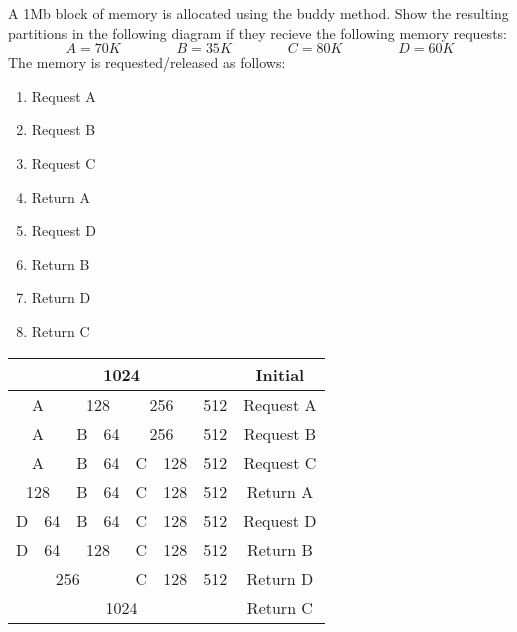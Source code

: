 \documentclass{article}
\begin{document}
\indent A 1Mb block of memory is allocated using the buddy method.
Show the resulting partitions in the following diagram if they recieve the
following memory requests:
\[
A = 70K\qquad\qquad B=35K\qquad\qquad C=80K\qquad\qquad D=60K
\]
The memory is requested/released as follows:
\begin{multicols}{2}
\begin{enumerate}
\item Request A
\item Request B
\item Request C
\item Return A
\item Request D
\item Return B
\item Return D
\item Return C
\end{enumerate}
\end{multicols}

\vspace{0.5cm}
\begin{center}
\begin{tabular}{|c c c c c c c c c c c c c c c c|c|}
\hline
\multicolumn{16}{|c|}{1024} & Initial\\
\hline
\multicolumn{2}{|c|}{A} & \multicolumn{2}{|c|}{128} & \multicolumn{4}{|c|}{256} & \multicolumn{8}{|c|}{512} & Request A\\
\hline
\multicolumn{2}{|c|}{A} & \multicolumn{1}{|c|}{B} & \multicolumn{1}{|c|}{64} & \multicolumn{4}{|c|}{256} & \multicolumn{8}{|c|}{512} & Request B\\
\hline
\multicolumn{2}{|c|}{A} & \multicolumn{1}{|c|}{B} & \multicolumn{1}{|c|}{64} & \multicolumn{2}{|c|}{C} & \multicolumn{2}{|c|}{128} & \multicolumn{8}{|c|}{512} & Request C\\
\hline
\multicolumn{2}{|c|}{128} & \multicolumn{1}{|c|}{B} & \multicolumn{1}{|c|}{64} & \multicolumn{2}{|c|}{C} & \multicolumn{2}{|c|}{128} & \multicolumn{8}{|c|}{512} & Return A\\
\hline
\multicolumn{1}{|c|}{D} & \multicolumn{1}{|c|}{64} & \multicolumn{1}{|c|}{B} & \multicolumn{1}{|c|}{64} & \multicolumn{2}{|c|}{C} & \multicolumn{2}{|c|}{128} & \multicolumn{8}{|c|}{512} & Request D\\
\hline
\multicolumn{1}{|c|}{D} & \multicolumn{1}{|c|}{64} & \multicolumn{2}{|c|}{128} & \multicolumn{2}{|c|}{C} & \multicolumn{2}{|c|}{128} & \multicolumn{8}{|c|}{512} & Return B\\
\hline
\multicolumn{4}{|c|}{256} & \multicolumn{2}{|c|}{C} & \multicolumn{2}{|c|}{128} & \multicolumn{8}{|c|}{512} & Return D\\
\hline
\multicolumn{16}{|c|}{1024} & Return C\\
\hline
\end{tabular}
\end{center}
\newpage
\end{document}
